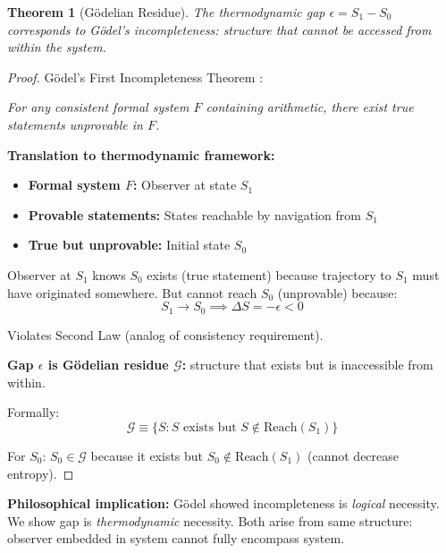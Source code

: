 \documentclass[twocolumn,10pt]{revtex4-2}
\newtheorem{theorem}{Theorem}[section]
\theoremstyle{definition}
\theoremstyle{remark}
\begin{document}
\begin{theorem}[Gödelian Residue]
\label{thm:godel_connection}
The thermodynamic gap $\epsilon = S_1 - S_0$ corresponds to Gödel's incompleteness: structure that cannot be accessed from within the system.
\end{theorem}

\begin{proof}
Gödel's First Incompleteness Theorem \cite{Godel1931}:

\textit{For any consistent formal system $F$ containing arithmetic, there exist true statements unprovable in $F$.}

\vspace{0.2cm}
\noindent\textbf{Translation to thermodynamic framework:}

\begin{itemize}
\item \textbf{Formal system $F$:} Observer at state $S_1$
\item \textbf{Provable statements:} States reachable by navigation from $S_1$
\item \textbf{True but unprovable:} Initial state $S_0$
\end{itemize}

Observer at $S_1$ knows $S_0$ exists (true statement) because trajectory to $S_1$ must have originated somewhere. But cannot reach $S_0$ (unprovable) because:
\begin{equation}
S_1 \to S_0 \implies \Delta S = -\epsilon < 0
\end{equation}

Violates Second Law (analog of consistency requirement).

\vspace{0.2cm}
\noindent\textbf{Gap $\epsilon$ is Gödelian residue $\mathcal{G}$:} structure that exists but is inaccessible from within.

Formally:
\begin{equation}
\mathcal{G} \equiv \{S : S \text{ exists but } S \not\in \text{Reach}(S_1)\}
\end{equation}

For $S_0$: $S_0 \in \mathcal{G}$ because it exists but $S_0 \not\in \text{Reach}(S_1)$ (cannot decrease entropy).
\end{proof}

\vspace{0.2cm}
\noindent\textbf{Philosophical implication:} Gödel showed incompleteness is \textit{logical} necessity. We show gap is \textit{thermodynamic} necessity. Both arise from same structure: observer embedded in system cannot fully encompass system.
\end{document}
